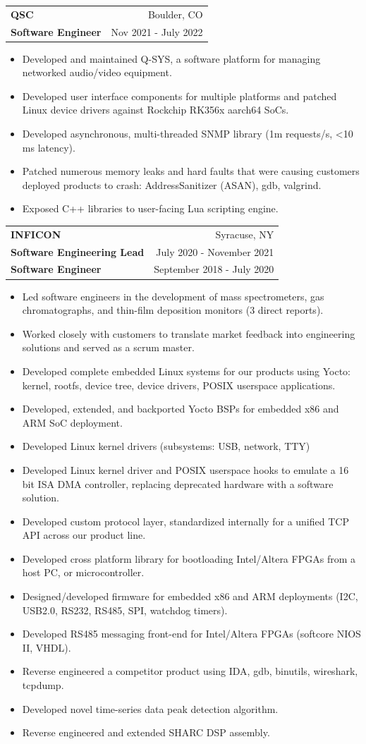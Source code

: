 \documentclass[letterpaper,11pt]{article}
\makeatletter
\newcommand{\resumeItem}[1]{
	\item\small{
		\textnormal{#1 \vspace{-2pt}}
	}
}
\newcommand{\resumeSubHeadingWithPromotion}[6]{
	\vspace{-1pt}\item
	\begin{tabular*}{0.97\textwidth}{l@{\extracolsep{\fill}}r}
		\textbf{#1} & #2 \\
		#3 & #4 \\
		\textbf{#5} & #6 \\
	\end{tabular*}
	\vspace{-5pt}
}
\newcommand{\resumeSubheading}[4]{
	\vspace{-1pt}\item
	\begin{tabular*}{0.97\textwidth}{l@{\extracolsep{\fill}}r}
		\textbf{#1} & #2 \\
		#3 & #4 \\
	\end{tabular*}
	\vspace{-5pt}
}
\newcommand{\resumeItemListStart}{\begin{itemize}}
\newcommand{\resumeItemListEnd}{\end{itemize}\vspace{-5pt}}
\makeatother
\begin{document}
	\resumeSubheading{QSC}{Boulder, CO}{\textbf{Software Engineer}}{Nov 2021 - July 2022}
	\resumeItemListStart
	\resumeItem{Developed and maintained Q-SYS, a software platform for managing networked audio/video equipment.}
	\resumeItem{Developed user interface components for multiple platforms and patched Linux device drivers against Rockchip RK356x aarch64 SoCs.}
	\resumeItem{Developed asynchronous, multi-threaded SNMP library (1m requests/s, \textless10 ms latency).}
	\resumeItem{Patched numerous memory leaks and hard faults that were causing customers deployed products to crash: AddressSanitizer (ASAN), gdb, valgrind.}
	\resumeItem{Exposed C++ libraries to user-facing Lua scripting engine.}
	\resumeItemListEnd
	
	
	\resumeSubHeadingWithPromotion{INFICON}{Syracuse, NY}{\textbf{Software Engineering Lead}}{July 2020 - November 2021}{\textbf{Software Engineer}}{September 2018 - July 2020}
	\resumeItemListStart
	\resumeItem{Led software engineers in the development of mass spectrometers, gas chromatographs, and thin-film deposition monitors (3 direct reports).}
	\resumeItem{Worked closely with customers to translate market feedback into engineering solutions and served as a scrum master.}
	\resumeItem{Developed complete embedded Linux systems for our products using Yocto: kernel, rootfs, device tree, device drivers, POSIX userspace applications.}
	\resumeItem{Developed, extended, and backported Yocto BSPs for embedded x86 and ARM SoC deployment.}
	\resumeItem{Developed Linux kernel drivers (subsystems: USB, network, TTY)}
	\resumeItem{Developed Linux kernel driver and POSIX userspace hooks to emulate a 16 bit ISA DMA controller, replacing deprecated hardware with a software solution.}
	\resumeItem{Developed custom protocol layer, standardized internally for a unified TCP API across our product line.}
	\resumeItem{Developed cross platform library for bootloading Intel/Altera FPGAs from a host PC, or microcontroller.}
	\resumeItem{Designed/developed firmware for embedded x86 and ARM deployments (I2C, USB2.0, RS232, RS485, SPI, watchdog timers).}
	\resumeItem{Developed RS485 messaging front-end for Intel/Altera FPGAs (softcore NIOS II, VHDL).}
	\resumeItem{Reverse engineered a competitor product using IDA, gdb, binutils, wireshark, tcpdump.}
	\resumeItem{Developed novel time-series data peak detection algorithm.}
	\resumeItem{Reverse engineered and extended SHARC DSP assembly.}
	\resumeItemListEnd
		
\end{document}
